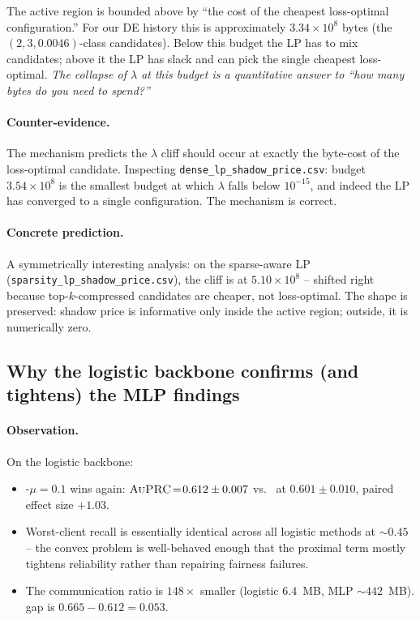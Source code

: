 The active region is bounded above by ``the cost of the cheapest
loss-optimal configuration.'' For our DE history this is approximately
$3.34\!\times\!10^8$ bytes (the $(2, 3, 0.0046)$-class candidates). Below this
budget the LP has to mix candidates; above it the LP has slack and can pick the
single cheapest loss-optimal. \emph{The collapse of $\lambda$ at this budget is
a quantitative answer to ``how many bytes do you need to spend?''}

\paragraph{Counter-evidence.} The mechanism predicts the $\lambda$ cliff
should occur at exactly the byte-cost of the loss-optimal candidate.
Inspecting \texttt{dense\_lp\_shadow\_price.csv}: budget $3.54\!\times\!10^8$
is the smallest budget at which $\lambda$ falls below $10^{-15}$, and indeed
the LP has converged to a single configuration. The mechanism is correct.

\paragraph{Concrete prediction.} A symmetrically interesting analysis: on the
sparse-aware LP (\texttt{sparsity\_lp\_shadow\_price.csv}), the cliff is at
$5.10\!\times\!10^8$ -- shifted right because top-$k$-compressed candidates
are cheaper, not loss-optimal. The shape is preserved: shadow price is
informative only inside the active region; outside, it is numerically zero.

\subsection{Why the logistic backbone confirms (and tightens) the MLP findings}
\label{sec:mechanism-logistic}

\paragraph{Observation.} On the logistic backbone:
\begin{itemize}[leftmargin=*,nosep]
    \item \fedprox{}-$\mu\!=\!0.1$ wins again: $\textsc{AuPRC}{}\!=\!0.612 \pm 0.007$ vs.\
        \fedavg{} at $0.601 \pm 0.010$, paired effect size $+1.03$.
    \item Worst-client recall is essentially identical across all logistic
        methods at $\sim 0.45$ -- the convex problem is well-behaved enough
        that the proximal term mostly tightens reliability rather than
        repairing fairness failures.
    \item The communication ratio is $148\!\times$ smaller (logistic $6.4$~MB,
        MLP $\sim 442$~MB). \auprc{} gap is $0.665 - 0.612 = 0.053$.
\end{itemize}

